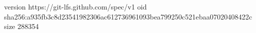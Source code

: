version https://git-lfs.github.com/spec/v1
oid sha256:a935fb3c8d23541982306ac612736961093bea799250c521ebaa07020408422c
size 288354
